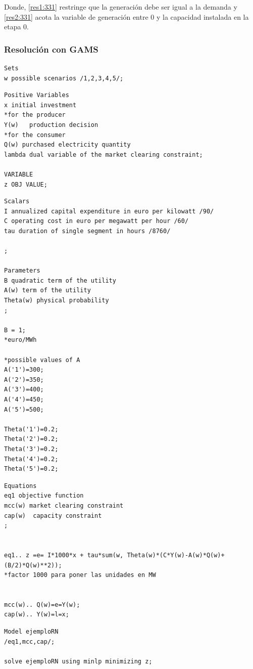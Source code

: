 Donde, \ref{res1:331} restringe que la generación debe ser igual a la demanda y \ref{res2:331} acota la variable de generación entre 0 y la capacidad instalada en la etapa 0.

\subsubsection{Resolución con GAMS}

\begin{lstlisting}
Sets
w possible scenarios /1,2,3,4,5/;
\end{lstlisting}

\begin{lstlisting}
Positive Variables
x initial investment
*for the producer
Y(w)   production decision
*for the consumer
Q(w) purchased electricity quantity
lambda dual variable of the market clearing constraint;

VARIABLE
z OBJ VALUE;   
\end{lstlisting}

\begin{lstlisting}
Scalars
I annualized capital expenditure in euro per kilowatt /90/
C operating cost in euro per megawatt per hour /60/
tau duration of single segment in hours /8760/

;

Parameters
B quadratic term of the utility
A(w) term of the utility
Theta(w) physical probability
;

B = 1;
*euro/MWh 

*possible values of A
A('1')=300;
A('2')=350;
A('3')=400;
A('4')=450;
A('5')=500;

Theta('1')=0.2;
Theta('2')=0.2;
Theta('3')=0.2;
Theta('4')=0.2;
Theta('5')=0.2;
\end{lstlisting}

\begin{lstlisting}
Equations
eq1 objective function
mcc(w) market clearing constraint
cap(w)  capacity constraint
;


eq1.. z =e= I*1000*x + tau*sum(w, Theta(w)*(C*Y(w)-A(w)*Q(w)+(B/2)*Q(w)**2));
*factor 1000 para poner las unidades en MW


mcc(w).. Q(w)=e=Y(w);
cap(w).. Y(w)=l=x;   
\end{lstlisting}

\begin{lstlisting}
Model ejemploRN
/eq1,mcc,cap/;

solve ejemploRN using minlp minimizing z;    
\end{lstlisting}


